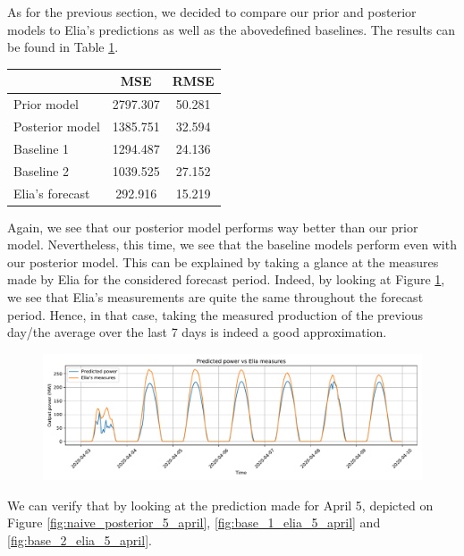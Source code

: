\documentclass[a4paper, 12pt]{article}
\begin{document}
As for the previous section, we decided to compare our prior and posterior models to Elia's predictions as well as the abovedefined baselines. The results can be found in Table \ref{tab:pv_metrics_for}.
\begin{table}[h]
	\centering
    \begin{tabular}{l|c|c}
                        & MSE      & RMSE   \\ \hline
        Prior model     & 2797.307  & 50.281 \\ \hline
        Posterior model & 1385.751  & 32.594 \\ \hline
        Baseline 1      & 1294.487 & 24.136 \\ \hline
        Baseline 2      & 1039.525 & 27.152 \\ \hline
        Elia's forecast & 292.916  & 15.219
    \end{tabular}
    \label{tab:pv_metrics_for}
\end{table}
Again, we see that our posterior model performs way better than our prior model. Nevertheless, this time, we see that the baseline models perform even with our posterior model. This can be explained by taking a glance at the measures made by Elia for the considered forecast period. Indeed, by looking at Figure \ref{fig:prior_model}, we see that Elia's measurements are quite the same throughout the forecast period. Hence, in that case, taking the measured production of the previous day/the average over the last 7 days is indeed a good approximation.
\begin{figure}[H]
    \centering
    \includegraphics[width=\textwidth]{resources/pdf/province_naive (03-04-2020).pdf}
    \label{fig:prior_model}
\end{figure}

We can verify that by looking at the prediction made for April 5, depicted on Figure \ref{fig:naive_posterior_5_april}, \ref{fig:base_1_elia_5_april} and \ref{fig:base_2_elia_5_april}.
\end{document}
